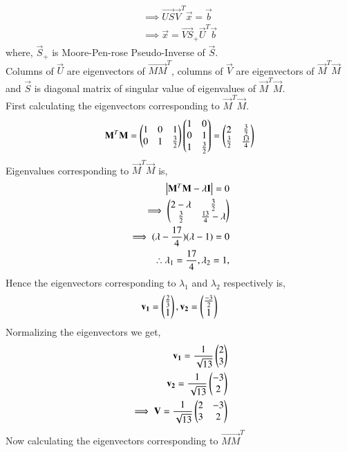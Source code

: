 \begin{align}
\implies \vec{US}\vec{V}^T\vec{x} = \vec{b}\\
\implies \vec{x} = \vec{VS}_+\vec{U}^T\vec{b} \label{eq:solutions/4/45/3/b/eq:x}
\end{align}
where, $\vec{S}_+$ is Moore-Pen-rose Pseudo-Inverse of $\vec{S}$.\\
Columns of $\vec{U}$ are eigenvectors of $\vec{MM}^T$, columns of $\vec{V}$ are eigenvectors of $\vec{M}^T\vec{M}$ and $\vec{S}$ is diagonal matrix of singular value of eigenvalues of $\vec{M}^T\vec{M}$.\\
First calculating the eigenvectors corresponding to $\vec{M}^T\vec{M}$.
\begin{align}
\mathbf{M}^T\mathbf{M} =  \begin{pmatrix}1&0&1\\0&1&\frac{3}{2}\end{pmatrix} \begin{pmatrix}1&0\\0&1\\1&\frac{3}{2}\end{pmatrix} = \begin{pmatrix}2&\frac{3}{2}\\\frac{3}{2}&\frac{13}{4}\end{pmatrix}
\end{align}
Eigenvalues corresponding to $\vec{M}^T\vec{M}$  is,
\begin{align}
\begin{vmatrix}\mathbf{M}^T\mathbf{M}-\lambda\mathbf{I}\end{vmatrix} = 0\\
\implies \begin{pmatrix}2-\lambda&\frac{3}{2}\\\frac{3}{2}&\frac{13}{4}-\lambda\end{pmatrix}\\
\implies (\lambda-\frac{17}{4})(\lambda-1) = 0\\
\therefore \lambda_1 = \frac{17}{4}, \lambda_2 = 1, \label{eq:solutions/4/45/3/b/eq:lambda2}
\end{align} 
Hence the eigenvectors corresponding to $\lambda_1$ and $\lambda_2$ respectively is,
\begin{align}
\mathbf{v_1} =\begin{pmatrix}\frac{2}{3}\\1\end{pmatrix}, \mathbf{v_2} =\begin{pmatrix}\frac{-3}{2}\\1\end{pmatrix}
\end{align}
Normalizing the eigenvectors we get,
\begin{align}
\mathbf{v_1} = \frac{1}{\sqrt{13}}\begin{pmatrix}2\\3\end{pmatrix}\\
\mathbf{v_2} = \frac{1}{\sqrt{13}}\begin{pmatrix}-3\\2\end{pmatrix}\\
\implies \mathbf{V} = \frac{1}{\sqrt{13}}\begin{pmatrix}2&-3\\3&2\end{pmatrix}\label{eq:solutions/4/45/3/b/eq:V}
\end{align}
Now calculating the eigenvectors corresponding to $\vec{MM}^T$
